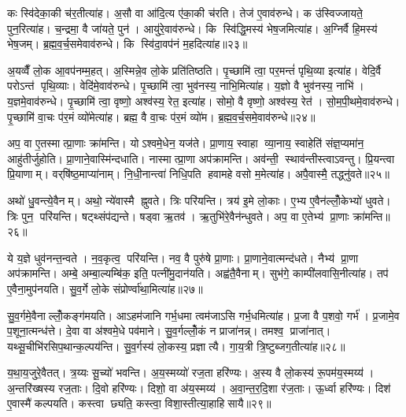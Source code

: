 कः स्वि॑देका॒की च॑र॒तीत्या॑ह। अ॒सौ वा आ॑दि॒त्य ए॑का॒की च॑रति। तेज॑ ए॒वाव॑रुन्धे। क उ॑स्विज्जायते॒ पुन॒रित्या॑ह। च॒न्द्रमा॒ वै जा॑यते॒ पुन॑। आयु॑रे॒वाव॑रुन्धे। कि स्वि॑द्धि॒मस्य॑ भेष॒जमित्या॑ह। अ॒ग्निर्वै हि॒मस्य॑ भेष॒जम्। ब्र॒ह्म॒व॒र्च॒समेवाव॑रुन्धे। कि स्वि॑दा॒वप॑नं म॒हदित्या॑ह॥२३॥

अ॒यव्वैँ लो॒क आ॒वप॑नम्म॒हत्। अ॒स्मिन्ने॒व लो॒के प्रति॑तिष्ठति। पृ॒च्छामि॑ त्वा॒ पर॒मन्तं॑ पृथि॒व्या इत्या॑ह। वेदि॒र्वै परोऽन्त॑ पृथि॒व्याः। वेदि॑मे॒वाव॑रुन्धे। पृ॒च्छामि॑ त्वा॒ भुव॑नस्य॒ नाभि॒मित्या॑ह। य॒ज्ञो वै भुव॑नस्य॒ नाभि॑। य॒ज्ञमे॒वाव॑रुन्धे। पृ॒च्छामि॑ त्वा॒ वृष्णो॒ अश्व॑स्य॒ रेत॒ इत्या॑ह। सोमो॒ वै वृष्णो॒ अश्व॑स्य॒ रेत॑। सो॒म॒पी॒थमे॒वाव॑रुन्धे। पृ॒च्छामि॑ वा॒चः प॑र॒मं व्यो॑मेत्या॑ह। ब्रह्म॒ वै वा॒चः प॑र॒मं व्यो॑म। ब्र॒ह्म॒व॒र्च॒समे॒वाव॑रुन्धे॥२४॥\anuvakamend[होता॑ भवति॒ वै वृष्टि॑ पू॒र्वचि॑त्तिर॒न्नाद्य॑मे॒वाव॑रुन्धे म॒हदित्या॑ह॒ सोमो॒ वै वृष्णो॒ अश्व॑स्य॒ रेत॑श्च॒त्वारि॑ च]

अप॒ वा ए॒तस्मात्प्रा॒णाः क्रा॑मन्ति। योऽश्वमे॒धेन॒ यज॑ते। प्रा॒णाय॒ स्वाहा व्या॒नाय॒ स्वाहेति॑ संज्ञ॒प्यमा॑न॒ आहु॑तीर्जुहोति। प्रा॒णाने॒वास्मि॑न्दधाति। नास्मात्प्रा॒णा अप॑क्रामन्ति। अव॑न्ती॒ स्थाव॑न्तीस्त्वाऽवन्तु। प्रि॒यन्त्वा प्रि॒याणाम्। वर्‌षि॑ष्ठ॒माप्या॑नाम्। नि॒धी॒नान्त्वा॑ निधि॒पति हवामहे वसो म॒मेत्या॑ह। अपै॒वास्मै॒ तद्ध्नु॑वते॥२५॥

अथो॑ धु॒वन्त्ये॒वैनम्। अथो॒ न्ये॑वास्मै ह्नुवते। त्रिः परि॑यन्ति। त्रय॑ इ॒मे लो॒काः। ए॒भ्य ए॒वैन॑ल्लोँ॒केभ्यो॑ धुवते। त्रिः पुन॒ परि॑यन्ति। षट्थ्संप॑द्यन्ते। षड्वा ऋ॒तव॑। ऋ॒तुभि॑रे॒वैन॑न्धुवते। अप॒ वा ए॒तेभ्य॑ प्रा॒णाः क्रा॑मन्ति॥२६॥

ये य॒ज्ञे धुव॑नन्त॒न्वते। न॒व॒कृत्व॒ परि॑यन्ति। नव॒ वै पुरु॑षे प्रा॒णाः। प्रा॒णाने॒वात्मन्द॑धते। नैभ्य॑ प्रा॒णा अप॑क्रामन्ति। अम्बे॒ अम्बा॒ल्यम्बि॑क॒ इति॒ पत्नी॑मु॒दान॑यति। अह्व॑तै॒वैनाम्। सुभ॑गे॒ काम्पी॑लवासि॒नीत्या॑ह। तप॑ ए॒वैना॒मुप॑नयति। सु॒व॒र्गे लो॒के संप्रोर्ण्वा॑था॒मित्या॑ह॥२७॥

सु॒व॒र्गमे॒वैनाल्लोँ॒कङ्ग॑मयति। आऽहम॑जानि गर्भ॒धमा त्वम॑जाऽसि गर्भ॒धमित्या॑ह। प्र॒जा वै प॒शवो॒ गर्भ॑। प्र॒जामे॒व प॒शूना॒त्मन्ध॑त्ते। दे॒वा वा अ॑श्वमे॒धे पव॑माने। सु॒व॒र्गल्लोँ॒कं न प्राजा॑नन्न्। तमश्व॒ प्राजा॑नात्। यथ्सू॒चीभि॑रसिप॒थान्क॒ल्पय॑न्ति। सु॒व॒र्गस्य॑ लो॒कस्य॒ प्रज्ञात्यै। गा॒य॒त्री त्रि॒ष्टुब्जग॒तीत्या॑ह॥२८॥

य॒था॒य॒जुरे॒वैतत्। त्र॒य्यः सू॒च्यो॑ भवन्ति। अ॒य॒स्मय्यो॑ रज॒ता हरि॑ण्यः। अ॒स्य वै लो॒कस्य॑ रू॒पम॑य॒स्मय्य॑। अ॒न्तरि॑ख्षस्य रज॒ताः। दि॒वो हरि॑ण्यः। दिशो॒ वा अ॑य॒स्मय्य॑। अ॒वा॒न्त॒र॒दि॒शा र॑ज॒ताः। ऊ॒र्ध्वा हरि॑ण्यः। दिश॑ ए॒वास्मै॑ कल्पयति। कस्त्वा छ्यति॒ कस्त्वा॒ विशा॒स्तीत्या॒हाहिसायै॥२९॥\anuvakamend[ह्नु॒व॒ते॒ क्रा॒म॒न्त्यू॒र्ण्वा॒था॒मित्या॑ह॒ जग॒तीत्या॑ह कल्पय॒त्येक॑ञ्च]

